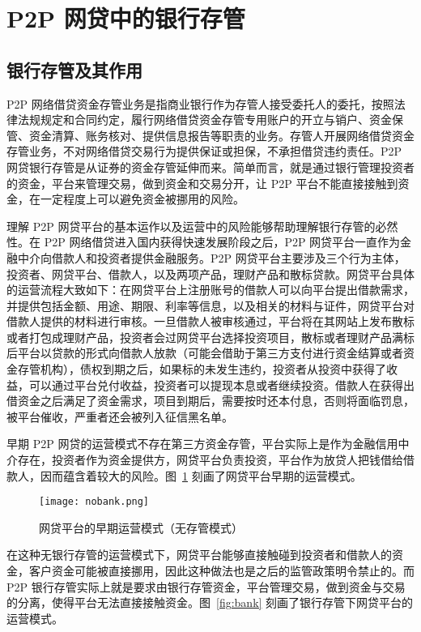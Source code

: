\documentclass[lang=cn,11pt]{elegantpaper}
\begin{document}
\section{P2P 网贷中的银行存管}

\subsection{银行存管及其作用}

P2P 网络借贷资金存管业务是指商业银行作为存管人接受委托人的委托，按照法律法规规定和合同约定，履行网络借贷资金存管专用账户的开立与销户、资金保管、资金清算、账务核对、提供信息报告等职责的业务。存管人开展网络借贷资金存管业务，不对网络借贷交易行为提供保证或担保，不承担借贷违约责任。P2P 网贷银行存管是从证券的资金存管延伸而来。简单而言，就是通过银行管理投资者的资金，平台来管理交易，做到资金和交易分开，让 P2P 平台不能直接接触到资金，在一定程度上可以避免资金被挪用的风险。
 


理解 P2P 网贷平台的基本运作以及运营中的风险能够帮助理解银行存管的必然性。在 P2P 网络借贷进入国内获得快速发展阶段之后，P2P 网贷平台一直作为金融中介向借款人和投资者提供金融服务。P2P 网贷平台主要涉及三个行为主体，投资者、网贷平台、借款人，以及两项产品，理财产品和散标贷款。网贷平台具体的运营流程大致如下：在网贷平台上注册账号的借款人可以向平台提出借款需求，并提供包括金额、用途、期限、利率等信息，以及相关的材料与证件，网贷平台对借款人提供的材料进行审核。一旦借款人被审核通过，平台将在其网站上发布散标或者打包成理财产品，投资者会过网贷平台选择投资项目，散标或者理财产品满标后平台以贷款的形式向借款人放款（可能会借助于第三方支付进行资金结算或者资金存管机构），债权到期之后，如果标的未发生违约，投资者从投资中获得了收益，可以通过平台兑付收益，投资者可以提现本息或者继续投资。借款人在获得出借资金之后满足了资金需求，项目到期后，需要按时还本付息，否则将面临罚息，被平台催收，严重者还会被列入征信黑名单。


早期 P2P 网贷的运营模式不存在第三方资金存管，平台实际上是作为金融信用中介存在，投资者作为资金提供方，网贷平台负责投资，平台作为放贷人把钱借给借款人，因而蕴含着较大的风险。图~\ref{fig:nobank} 刻画了网贷平台早期的运营模式。

 \begin{figure}[hbtp]
\centering
\texttt{[image: nobank.png]}
\caption{ 网贷平台的早期运营模式（无存管模式）\label{fig:nobank}}
\end{figure}

在这种无银行存管的运营模式下，网贷平台能够直接触碰到投资者和借款人的资金，客户资金可能被直接挪用，因此这种做法也是之后的监管政策明令禁止的。而 P2P 银行存管实际上就是要求由银行存管资金，平台管理交易，做到资金与交易的分离，使得平台无法直接接触资金。图~\ref{fig:bank} 刻画了银行存管下网贷平台的运营模式。
\end{document}

